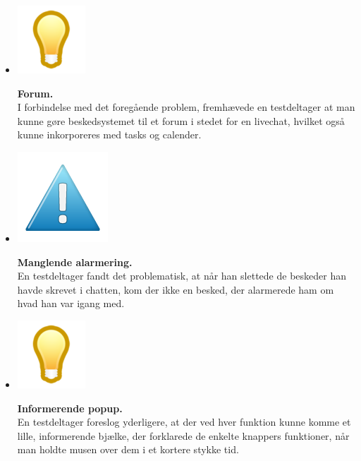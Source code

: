 \documentclass[12pt]{article}
\begin{document}
\begin{itemize}
   \item[]       \begin{minipage}{0.07\linewidth}
  \includegraphics[scale=0.4]{Billeder/ide}
          \end{minipage} \textbf{Forum.}\\ I forbindelse med det foregående problem, fremhævede en testdeltager at man kunne gøre beskedsystemet til et forum i stedet for en livechat, hvilket også kunne inkorporeres med tasks og calender.
  
   \item[]       \begin{minipage}{0.07\linewidth}
  \includegraphics[scale=0.3]{Billeder/mindre}
          \end{minipage} \textbf{Manglende alarmering.} \\En testdeltager fandt det problematisk, at når han slettede de beskeder han havde skrevet i chatten, kom der ikke en besked, der alarmerede ham om hvad han var igang med.
  
   \item[]       \begin{minipage}{0.07\linewidth}
  \includegraphics[scale=0.4]{Billeder/ide}
          \end{minipage} \textbf{Informerende popup.} \\En testdeltager foreslog yderligere, at der ved hver funktion kunne komme et lille, informerende bjælke, der forklarede de enkelte knappers funktioner, når man holdte musen over dem i et kortere stykke tid.
\end{itemize}
\newpage
\end{document}
